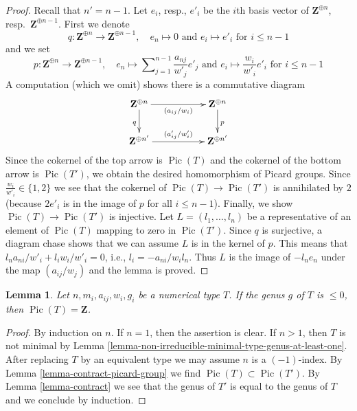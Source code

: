 \documentclass{stacks-project}
\theoremstyle{plain}
\newtheorem{lemma}[subsection]{Lemma}
\theoremstyle{definition}
\theoremstyle{remark}
\numberwithin{equation}{subsection}
\def\Pic{\mathop{\mathrm{Pic}}\nolimits}
\begin{document}
\begin{proof}
Recall that $n' = n - 1$. Let $e_i$, resp., $e'_i$ be the $i$th
basis vector of $\mathbf{Z}^{\oplus n}$, resp.\ $\mathbf{Z}^{\oplus n - 1}$.
First we denote
$$
q : \mathbf{Z}^{\oplus n} \to \mathbf{Z}^{\oplus n - 1},
\quad e_n \mapsto 0\text{ and }e_i \mapsto e'_i\text{ for }i \leq n - 1
$$
and we set
$$
p : \mathbf{Z}^{\oplus n} \to \mathbf{Z}^{\oplus n - 1},\quad
e_n \mapsto \sum\nolimits_{j = 1}^{n - 1} \frac{a_{nj}}{w'_j} e'_j
\text{ and }
e_i \mapsto \frac{w_i}{w'_i} e'_i\text{ for }i \leq n - 1
$$
A computation (which we omit) shows there is a commutative diagram
$$
\xymatrix{
\mathbf{Z}^{\oplus n} \ar[rr]_{(a_{ij}/w_i)} \ar[d]_q & &
\mathbf{Z}^{\oplus n} \ar[d]^p \\
\mathbf{Z}^{\oplus n'} \ar[rr]^{(a'_{ij}/w'_i)} & &
\mathbf{Z}^{\oplus n'}
}
$$
Since the cokernel of the top arrow is
$\Pic(T)$ and the cokernel of the bottom arrow
is $\Pic(T')$, we obtain the desired homomorphism
of Picard groups. Since $\frac{w_i}{w'_i} \in \{1, 2\}$
we see that the cokernel of $\Pic(T) \to \Pic(T')$
is annihilated by $2$ (because $2e'_i$ is in the image of $p$
for all $i \leq n - 1$).
Finally, we show $\Pic(T) \to \Pic(T')$ is injective.
Let $L = (l_1, \ldots, l_n)$ be a representative
of an element of $\Pic(T)$ mapping to zero in $\Pic(T')$.
Since $q$ is surjective, a diagram chase shows that we can assume
$L$ is in the kernel of $p$. This means that
$l_na_{ni}/w'_i + l_iw_i/w'_i = 0$, i.e., $l_i = - a_{ni}/w_i l_n$.
Thus $L$ is the image of $-l_ne_n$ under the map $(a_{ij}/w_j)$
and the lemma is proved.
\end{proof}

\begin{lemma}
\label{lemma-picard-group-genus-nonpositive}
Let $n, m_i, a_{ij}, w_i, g_i$ be a numerical type $T$.
If the genus $g$ of $T$ is $\leq 0$, then $\Pic(T) = \mathbf{Z}$.
\end{lemma}

\begin{proof}
By induction on $n$. If $n = 1$, then the assertion is clear.
If $n > 1$, then $T$ is not minimal by
Lemma \ref{lemma-non-irreducible-minimal-type-genus-at-least-one}.
After replacing $T$ by an equivalent type
we may assume $n$ is a $(-1)$-index.
By Lemma \ref{lemma-contract-picard-group}
we find $\Pic(T) \subset \Pic(T')$.
By Lemma \ref{lemma-contract} we see that the genus
of $T'$ is equal to the genus of $T$ and we conclude by
induction.
\end{proof}
\end{document}
